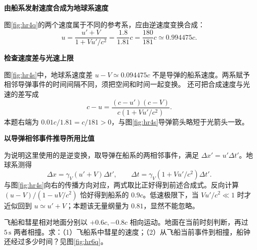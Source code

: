 \begin{solution}\textbf{由船系发射速度合成为地球系速度}\par\nobreak
图\ref{fig:hr4q}的两个速度属于不同的参考系，应由逆速度变换合成：
\[
u=\frac{u'+V}{1+Vu'/c^2}
=\frac{1.8}{1.81}c
=\boxed{\frac{180}{181}c\simeq0.994475c}.
\]



\par\medskip{}\noindent\textbf{检查速度差与光速上限}\par\nobreak
图\ref{fig:hr4s}中，地球系速度差 $u-V\simeq0.094475c$ 不是导弹的船系速度。两系赋予相邻导弹事件的时间间隔不同，须把空间和时间一起变换。
还可把合成速度与光速的差写成
\[
c-u=\frac{(c-u')(c-V)}{c(1+Vu'/c^2)}.
\]
本题右端为 $0.01c/1.81=c/181>0$，与图\ref{fig:hr4s}导弹箭头略短于光箭头一致。



\par\medskip{}\noindent\textbf{以导弹相邻事件推导所用比值}\par\nobreak
为说明这里使用的是逆变换，取导弹在船系的两相邻事件，满足 \(\Delta x'=u'\Delta t'\)。地球系测得
\[
 \Delta x=\gamma_V(u'+V)\Delta t',\qquad
 \Delta t=\gamma_V(1+Vu'/c^2)\Delta t'.
\]
与图\ref{fig:hr4s}向右的传播方向对应，两式取比正好得到前述合成式。反向计算 $(u-V)/(1-uV/c^2)$ 恰好得到船系的 $0.9c$。低速极限下，当 \(Vu'/c^2\ll1\) 时才近似回到 \(u\simeq u'+V\)；本题该无量纲量为 \(0.81\)，显然不能忽略。
\end{solution}

\begin{question}
\begin{example}[飞船与彗星的相撞时间]\label{ex:hr6}
飞船和彗星相对地面分别以 $+0.6c,-0.8c$ 相向运动。地面在当前时刻判断，再过 $5\,\mathrm s$ 两者相撞。求：（1）飞船系中彗星的速度；（2）从飞船当前事件到相撞，船钟还经过多少时间？见图\ref{fig:hr6q}。
\end{example}
\end{question}

